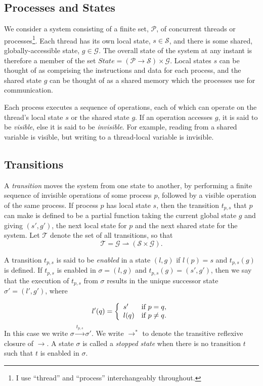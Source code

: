 \documentclass[12pt,a4paper,twoside,openright]{report}
\begin{document}
\subsection{Processes and States}
We consider a system consisting of a finite set, $\mathcal{P}$,
of concurrent threads or processes\footnote{I use ``thread'' and
``process'' interchangeably throughout.}.
Each thread has its own local state, $s \in \mathcal{S}$, and there
is some shared, globally-accessible state, $g \in \mathcal{G}$. The overall
state of the system at any instant is therefore a member of the set
$ \textit{State} = (\mathcal{P} \to \mathcal{S}) \times \mathcal{G} $.
Local states $s$ can be thought of as comprising the instructions
and data for each process, and the shared state $g$ can be thought
of as a shared memory which the processes use for communication.

Each process executes a sequence of operations, each of which can
operate on the thread's local state $s$ or the shared
state $g$. If an operation
accesses $g$, it is said to be \emph{visible}, else it is said to be
\emph{invisible}. For example, reading from a shared variable is
visible, but writing to a thread-local variable is invisible.

\subsection{Transitions}
\label{sec:trans-prep}
A \emph{transition} moves the system from one state to another,
by performing a finite sequence of invisible operations of some
process $p$, followed by a visible operation of the same process.
If process $p$ has local state $s$, then the transition $t_{p,s}$
that $p$ can make is defined to be a partial function taking the current
global state $g$ and giving $(s', g')$, the next local state for $p$
and the next shared state for the system. Let $\mathcal{T}$ denote the
set of all transitions, so that
	\[\mathcal{T} = \mathcal{G} \rightharpoonup
				(\mathcal{S} \times \mathcal{G}).\]

A transition $t_{p,s}$ is said to be \emph{enabled} in a state
$(l, g)$ if $l(p) = s$ and $t_{p,s}(g)$ is defined.
If $t_{p,s}$ is enabled in $\sigma = (l, g)$ and 
$t_{p,s}(g) = (s', g')$, then we say that the
execution of $t_{p,s}$ from $\sigma$ results in the unique successor
state $\sigma' = (l', g')$, where

\[
	l'(q) = \left\{\begin{array}{lr}
				s' & \textmd{if } p = q, \\
				l(q) &\textmd{if } p \neq q.
			\end{array} \right.
\]
In this case we write $\sigma \xrightarrow{t_{p,s}} \sigma'$.
We write $\longrightarrow^*$ to denote the transitive reflexive
closure of $\longrightarrow$.
A state $\sigma$ is called a \emph{stopped state} when there is no transition
$t$ such that $t$ is enabled in $\sigma$.
\end{document}
